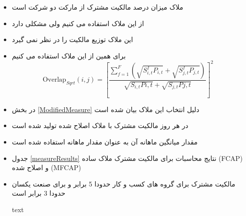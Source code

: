 \begin{itemize}
	\item 
	ملاک
	\cite{AntonPolk}
	میزان درصد مالکیت مشترک از مارکت دو شرکت است
	
	
	\item 
	از این ملاک استفاده می کنیم ولی مشکلی دارد
	\item 
	این ملاک توزیع مالکیت را در نظر نمی گیرد
		\item 
		برای همین از این ملاک استفاده می کنیم
		\begin{equation}
			\text{Overlap}_{Sqrt}(i, j) =  [\frac{\sum_{f =1}^{F}(\sqrt{S^f_{i,t}P_{i,t}}+\sqrt{S^f_{j,t}P_{j,t}})}{\sqrt{S_{i,t}P{i,t}} + \sqrt{S_{j,t}P{j,t}}}]^2 
			\label{sqrt0}
		\end{equation}
		\item
		در بخش 
		\ref{ModifiedMeasure}
		دلیل انتخاب این ملاک بیان شده است
\end{itemize}

\begin{LTR}

\end{LTR}




\begin{itemize}
	\item 
	در هر روز مالکیت مشترک با ملاک اصلاح شده تولید شده است
	\item 
مقدار میانگین ماهانه آن به عنوان مقدار ماهانه استفاده شده است
	\item 
جدول 
\ref{measureResults}
نتایج محاسبات برای مالکیت مشترک ملاک ساده 
(FCAP)
و اصلاح شده
(MFCAP)

\item
مالکیت مشترک برای گروه های کسب و کار حدودا 5 برابر و برای صنعت یکسان حدودا 3 برابر است

\begin{table}[htbp]
	\caption{ text}
	\label{measureResults}
	\resizebox{\textwidth}{!}
	{
		\begin{LTR}
			\lr{}
			\end{LTR}
	}
\end{table}


\end{itemize}

  \FloatBarrier
